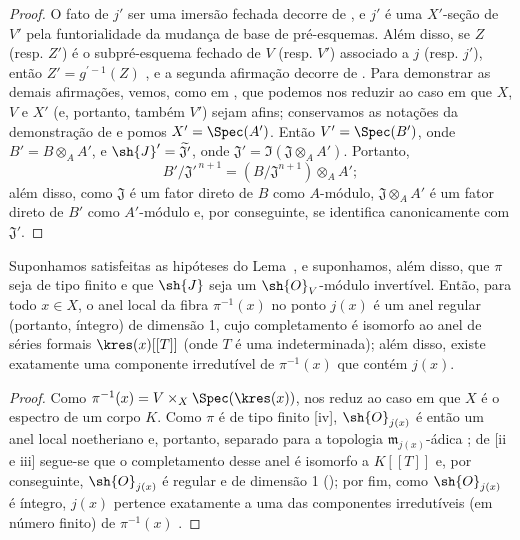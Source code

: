 \documentclass[oneside,10pt]{amsart}
\let\EGAOriginalLabel\label
\renewcommand{\label}[1]{\phantomsection\EGAOriginalLabel{#1}}
\begin{document}
\begin{proof}
O fato de $j'$ ser uma imersão fechada decorre de , e $j'$ é uma $X'$-seção de $V'$ pela funtorialidade da mudança de base de pré-esquemas.
Além disso, se $Z$ (resp. $Z'$) é o subpré-esquema fechado de $V$ (resp. $V'$) associado a $j$ (resp. $j'$), então $Z'=g^{'-1}(Z)$ , e a segunda afirmação decorre de .
Para demonstrar as demais afirmações, vemos, como em , que podemos nos reduzir ao caso em que $X$, $V$ e $X'$ (e, portanto, também $V'$) sejam afins;
conservamos as notações da demonstração de  e pomos $X'=\Spec(A')$.
Então $V'=\Spec(B')$, onde $B'=B\otimes_A A'$, e $\sh{J}'=\widetilde{\mathfrak{J}'}$, onde $\mathfrak{J}'=\Im(\mathfrak{J}\otimes_A A')$.
Portanto,
\[
  B'/\mathfrak{J}'^{\,n+1}
  =(B/\mathfrak{J}^{n+1})\otimes_A A';
\]
além disso, como $\mathfrak{J}$ é um fator direto de $B$ como $A$-módulo, $\mathfrak{J}\otimes_A A'$ é um fator direto de $B'$ como $A'$-módulo e, por conseguinte, se identifica canonicamente com $\mathfrak{J}'$.
\end{proof}

\begin{corollary}[8.10.3]
\label{II.8.10.3}
Suponhamos satisfeitas as hipóteses do Lema~, e suponhamos, além disso, que $\pi$ seja de tipo finito e que $\sh{J}$ seja um $\sh{O}_V$-módulo invertível.
Então, para todo $x\in X$, o anel local da fibra $\pi^{-1}(x)$ no ponto $j(x)$ é um anel regular (portanto, íntegro) de dimensão 1, cujo completamento é isomorfo ao anel de séries formais $\kres(x)[[T]]$ (onde $T$ é uma indeterminada);
além disso, existe exatamente uma componente irredutível de $\pi^{-1}(x)$ que contém $j(x)$.
\end{corollary}

\begin{proof}
Como $\pi^{-1}(x)=V\times_X\Spec(\kres(x))$,  nos reduz ao caso em que $X$ é o espectro de um corpo $K$.
Como $\pi$ é de tipo finito [iv], $\sh{O}_{j(x)}$ é então um anel local noetheriano e, portanto, separado para a topologia $\mathfrak{m}_{j(x)}$-ádica ;
de [ii e iii] segue-se que o completamento desse anel é isomorfo a $K[[T]]$ e, por conseguinte, $\sh{O}_{j(x)}$ é regular e de dimensão 1 (\cite[p.~17-01, th.~1]{I-1});
por fim, como $\sh{O}_{j(x)}$ é íntegro, $j(x)$ pertence exatamente a uma das componentes irredutíveis (em número finito) de $\pi^{-1}(x)$ .
\end{proof}
\end{document}
